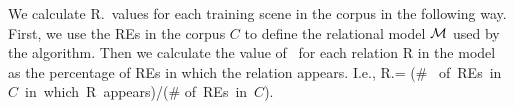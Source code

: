 We calculate R.\puse\ values for each training scene in the corpus in the following way.
First, we use the REs in the corpus $C$ to define the relational model $\mathcal{M}$
used by the algorithm.  
Then we calculate the value of \puse\ for each relation R in the model as the percentage of REs in which the relation appears.  I.e., 
R.\puse = (\# \mbox{ of REs in $C$ in which R appears})/(\# \mbox{of REs in $C$}).
%
%
%
%
%
%
